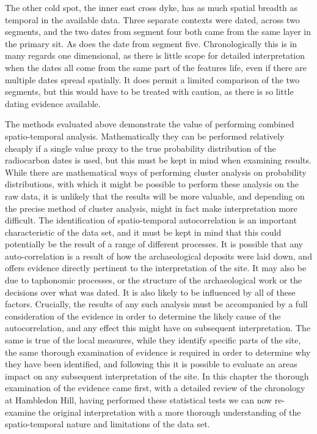 The other cold spot, the inner east cross dyke, has as much spatial breadth as temporal in the available data. Three separate contexts were dated, across two segments, and the two dates from segment four both came from the same layer in the primary sit. As does the date from segment five. Chronologically this is in many regards one dimensional, as there is little scope for detailed interpretation when the dates all come from the same part of the features life, even if there are multiple dates spread spatially. It does permit a limited comparison of the two segments, but this would have to be treated with caution, as there is so little dating evidence available.

The methods evaluated above demonstrate the value of performing combined spatio-temporal analysis. Mathematically they can be performed relatively cheaply if a single value proxy to the true probability distribution of the radiocarbon dates is used, but this must be kept in mind when examining results. While there are mathematical ways of performing cluster analysis on probability distributions, with which it might be possible to perform these analysis on the raw data, it is unlikely that the results will be more valuable, and depending on the precise method of cluster analysis, might in fact make interpretation more difficult. The identification of spatio-temporal autocorrelation is an important characteristic of the data set, and it must be kept in mind that this could potentially be the result of a range of different processes. It is possible that any auto-correlation is a result of how the archaeological deposits were laid down, and offers evidence directly pertinent to the interpretation of the site. It may also be due to taphonomic processes, or the structure of the archaeological work or the decisions over what was dated. It is also likely to be influenced by all of these factors. Crucially, the results of any such analysis must be accompanied by a full consideration of the evidence in order to determine the likely cause of the autocorrelation, and any effect this might have on subsequent interpretation. The same is true of the local measures, while they identify specific parts of the site, the same thorough examination of evidence is required in order to determine why they have been identified, and following this it is possible to evaluate an areas impact on any subsequent interpretation of the site. In this chapter the thorough examination of the evidence came first, with a detailed review of the chronology at Hambledon Hill, having performed these statistical tests we can now re-examine the original interpretation with a more thorough understanding of the spatio-temporal nature and limitations of the data set.

